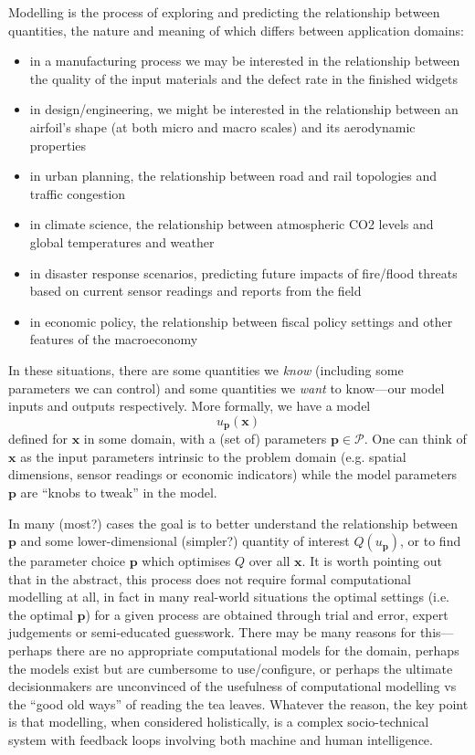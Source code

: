 \documentclass[a4paper,fontsize=12pt]{scrartcl}
\begin{document}
Modelling is the process of exploring and predicting the relationship
between quantities, the nature and meaning of which differs between
application domains:
\begin{itemize}
\item in a manufacturing process we may be interested in the
  relationship between the quality of the input materials and the
  defect rate in the finished widgets
\item in design/engineering, we might be interested in the
  relationship between an airfoil's shape (at both micro and macro
  scales) and its aerodynamic properties
\item in urban planning, the relationship between road and rail
  topologies and traffic congestion
\item in climate science, the relationship between atmospheric CO2
  levels and global temperatures and weather
\item in disaster response scenarios, predicting future impacts of
  fire/flood threats based on current sensor readings and reports from
  the field
\item in economic policy, the relationship between fiscal policy
  settings and other features of the macroeconomy
\end{itemize}

In these situations, there are some quantities we \emph{know}
(including some parameters we can control) and some quantities we
\emph{want} to know---our model inputs and outputs
respectively. More formally, we have a model
\begin{equation}
  \label{eq:1}
  u_{\mathbf{p}}(\mathbf{x})
\end{equation}
defined for $\mathbf{x}$ in some domain, with a (set of) parameters
$\mathbf{p} \in \mathcal{P}$. One can think of $\mathbf{x}$ as the input
parameters intrinsic to the problem domain (e.g. spatial dimensions,
sensor readings or economic indicators) while the model parameters $\mathbf{p}$
are ``knobs to tweak'' in the model.

In many (most?) cases the goal is to better understand the
relationship between $\mathbf{p}$ and some lower-dimensional (simpler?)
quantity of interest $Q(u_{\mathbf{p}})$, or to find the parameter choice $\mathbf{p}$
which optimises $Q$ over all $\mathbf{x}$. It is worth pointing out
that in the abstract, this process does not require formal
computational modelling at all, in fact in many real-world situations
the optimal settings (i.e. the optimal $\mathbf{p}$) for a given process are
obtained through trial and error, expert judgements or semi-educated
guesswork. There may be many reasons for this---perhaps there are no
appropriate computational models for the domain, perhaps the models
exist but are cumbersome to use/configure, or perhaps the ultimate
decisionmakers are unconvinced of the usefulness of computational
modelling vs the ``good old ways'' of reading the tea leaves. Whatever
the reason, the key point is that modelling, when considered
holistically, is a complex socio-technical system with feedback loops
involving both machine and human intelligence.
\end{document}
